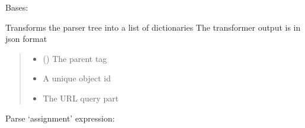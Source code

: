 \documentclass[letterpaper,10pt,english]{sphinxmanual}
\begin{document}
\begin{savenotes}\begin{fulllineitems}
\label{\detokenize{eezz:eezz.service.TServiceCompiler}}
\pysigstartsignatures
{}
\pysigstopsignatures
\sphinxAtStartPar
Bases: 

\sphinxAtStartPar
Transforms the parser tree into a list of dictionaries
The transformer output is in json format
\begin{quote}\begin{description}
\begin{itemize}
\item {} 
\sphinxAtStartPar
{} () \textendash{} The parent tag

\item {} 
\sphinxAtStartPar
{} \textendash{} A unique object id

\item {} 
\sphinxAtStartPar
{} \textendash{} The URL query part

\end{itemize}

\end{description}\end{quote}

\begin{savenotes}\begin{fulllineitems}
\label{\detokenize{eezz:eezz.service.TServiceCompiler.assignment}}
\pysigstartsignatures
{}
\pysigstopsignatures
\sphinxAtStartPar
Parse ‘assignment’ expression: 


\end{fulllineitems}
\end{savenotes}
\end{fulllineitems}
\end{savenotes}
\end{document}
